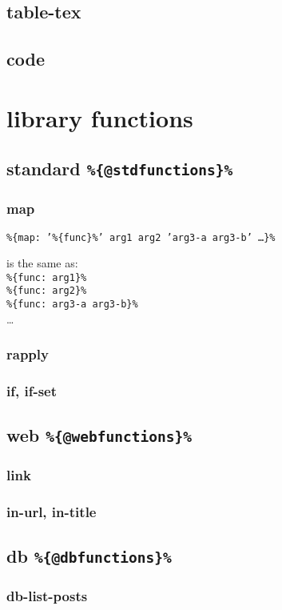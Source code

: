 \documentclass{memoir}
\newcommand{\var}[1]{\texttt{\%\{#1\}\%}}
\begin{document}
	\section{table-tex}
	\section{code}


\chapter{library functions} %

	\section{standard \var{@stdfunctions}} %

		\subsection{map} %
			\var{map: '\var{func}' arg1 arg2 'arg3-a arg3-b' \ldots}

			is the same as:\\
			\var{func: arg1}\\
			\var{func: arg2}\\
			\var{func: arg3-a arg3-b}\\
			\ldots


		\subsection{rapply}

		\subsection{if, if-set} %




	\section{web \var{@webfunctions}} %

		\subsection{link}
		\subsection{in-url, in-title}


	\section{db \var{@dbfunctions}} %

		\subsection{db-list-posts}




\printglossary
\end{document}
